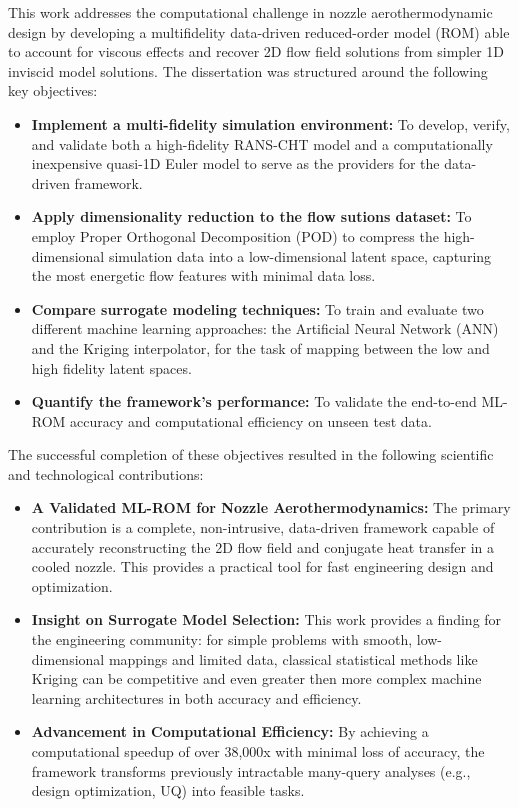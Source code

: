 \documentclass[tg, EN]{ufabcFHZh_tg}
\begin{document}
This work addresses the computational challenge in nozzle aerothermodynamic design by developing a multifidelity data-driven reduced-order model (ROM) able to account for viscous effects and recover 2D flow field solutions from simpler 1D inviscid model solutions. The dissertation was structured around the following key objectives:

\begin{itemize}
    \item \textbf{Implement a multi-fidelity simulation environment:} To develop, verify, and validate both a high-fidelity RANS-CHT model and a computationally inexpensive quasi-1D Euler model to serve as the providers for the data-driven framework.

    \item \textbf{Apply dimensionality reduction to the flow sutions dataset:} To employ Proper Orthogonal Decomposition (POD) to compress the high-dimensional simulation data into a low-dimensional latent space, capturing the most energetic flow features with minimal data loss.

    \item \textbf{Compare surrogate modeling techniques:} To train and evaluate two different machine learning approaches: the Artificial Neural Network (ANN) and the Kriging interpolator, for the task of mapping between the low and high fidelity latent spaces.
    
    \item \textbf{Quantify the framework's performance:} To validate the end-to-end ML-ROM accuracy and computational efficiency on unseen test data.
\end{itemize}

The successful completion of these objectives resulted in the following scientific and technological contributions:

\begin{itemize}
    \item \textbf{A Validated ML-ROM for Nozzle Aerothermodynamics:} The primary contribution is a complete, non-intrusive, data-driven framework capable of accurately reconstructing the 2D flow field and conjugate heat transfer in a cooled nozzle. This provides a practical tool for fast engineering design and optimization.

    \item \textbf{Insight on Surrogate Model Selection:} This work provides a finding for the engineering community: for simple problems with smooth, low-dimensional mappings and limited data, classical statistical methods like Kriging can be competitive and even greater then more complex machine learning architectures in both accuracy and efficiency.

    \item \textbf{Advancement in Computational Efficiency:} By achieving a computational speedup of over 38,000x with minimal loss of accuracy, the framework transforms previously intractable many-query analyses (e.g., design optimization, UQ) into feasible tasks.
\end{itemize}
\end{document}
